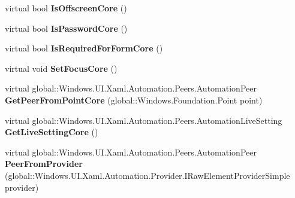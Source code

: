 \begin{DoxyCompactItemize}
virtual bool {\bfseries Is\+Offscreen\+Core} ()
\item 
\mbox{\label{class_windows_1_1_u_i_1_1_xaml_1_1_automation_1_1_peers_1_1_automation_peer_a28c53d7ba3793aef88acb71b50c0f7c1}} 
virtual bool {\bfseries Is\+Password\+Core} ()
\item 
\mbox{\label{class_windows_1_1_u_i_1_1_xaml_1_1_automation_1_1_peers_1_1_automation_peer_a0936e74a3f6ad1b97d4432d0e591f140}} 
virtual bool {\bfseries Is\+Required\+For\+Form\+Core} ()
\item 
\mbox{\label{class_windows_1_1_u_i_1_1_xaml_1_1_automation_1_1_peers_1_1_automation_peer_aa7889a5f57de469eafa2b358f03ce530}} 
virtual void {\bfseries Set\+Focus\+Core} ()
\item 
\mbox{\label{class_windows_1_1_u_i_1_1_xaml_1_1_automation_1_1_peers_1_1_automation_peer_af1a638c64d6aba46c623ea842fc206ac}} 
virtual global\+::\+Windows.\+U\+I.\+Xaml.\+Automation.\+Peers.\+Automation\+Peer {\bfseries Get\+Peer\+From\+Point\+Core} (global\+::\+Windows.\+Foundation.\+Point point)
\item 
\mbox{\label{class_windows_1_1_u_i_1_1_xaml_1_1_automation_1_1_peers_1_1_automation_peer_a237b9e6ecc2fb3779ea808e8460aaa07}} 
virtual global\+::\+Windows.\+U\+I.\+Xaml.\+Automation.\+Peers.\+Automation\+Live\+Setting {\bfseries Get\+Live\+Setting\+Core} ()
\item 
\mbox{\label{class_windows_1_1_u_i_1_1_xaml_1_1_automation_1_1_peers_1_1_automation_peer_afb1e787b7ca36dd06affdaa830a30a27}} 
virtual global\+::\+Windows.\+U\+I.\+Xaml.\+Automation.\+Peers.\+Automation\+Peer {\bfseries Peer\+From\+Provider} (global\+::\+Windows.\+U\+I.\+Xaml.\+Automation.\+Provider.\+I\+Raw\+Element\+Provider\+Simple provider)
\item 
\mbox{\label{class_windows_1_1_u_i_1_1_xaml_1_1_automation_1_1_peers_1_1_automation_peer_a8d1ce21375148b3c860bc66fa5df87fa}} 

\end{DoxyCompactItemize}
